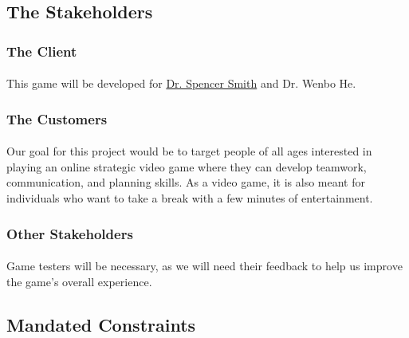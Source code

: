 \documentclass[12pt, titlepage]{article}
\begin{document}
\subsection{The Stakeholders}
\subsubsection{The Client}
\paragraph{}This game will be developed for \href{http://www.cas.mcmaster.ca/~smiths/}{Dr. Spencer Smith} and Dr. Wenbo He. 
\subsubsection{The Customers}
\paragraph{}Our goal for this project would be to target people of all ages interested in playing an online strategic video game where they can develop teamwork, communication, and planning skills. As a video game, it is also meant for individuals who want to take a break with a few minutes of entertainment.
\subsubsection{Other Stakeholders}
\paragraph{} Game testers will be necessary, as we will need their feedback to help us improve the game's overall experience.
\subsection{Mandated Constraints}
\end{document}
